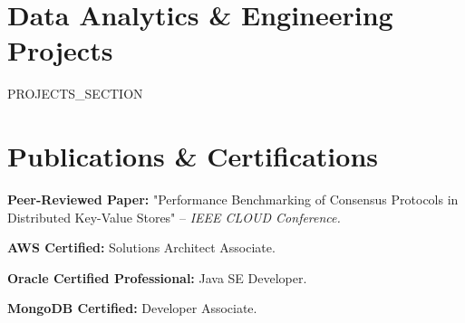 \documentclass[letterpaper,11pt]{article}
\newcommand{\resumeSubHeadingListStart}{\begin{itemize}[leftmargin=0pt, label={}]\vspace{-2pt}}
\newcommand{\resumeSubHeadingListEnd}{\end{itemize}\vspace{-3pt}}
\begin{document}
\section{Data Analytics \& Engineering Projects}
    \resumeSubHeadingListStart
{{PROJECTS_SECTION}}
    \resumeSubHeadingListEnd

\section{Publications \& Certifications}
 \begin{itemize}[leftmargin=0pt, label={}, itemsep=2.5pt, parsep=0pt]\vspace{-3pt}
    \small{
      \item \textbf{Peer-Reviewed Paper:} "Performance Benchmarking of Consensus Protocols in Distributed Key-Value Stores" -- \emph{IEEE CLOUD Conference.}
      \item \textbf{AWS Certified:} Solutions Architect Associate.
      \item \textbf{Oracle Certified Professional:} Java SE Developer.
      \item \textbf{MongoDB Certified:} Developer Associate.
    }
 \end{itemize}\vspace{-3pt}

\end{document}
